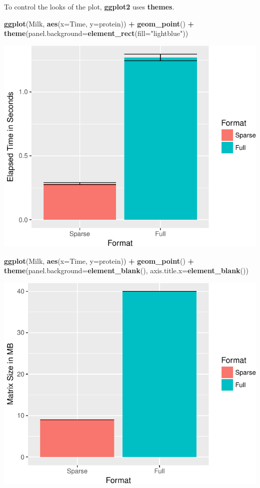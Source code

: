 \documentclass[]{book}
\newenvironment{Shaded}{\begin{snugshade}}{\end{snugshade}}
\newcommand{\KeywordTok}[1]{\textcolor[rgb]{0.13,0.29,0.53}{\textbf{#1}}}
\newcommand{\DataTypeTok}[1]{\textcolor[rgb]{0.13,0.29,0.53}{#1}}
\newcommand{\StringTok}[1]{\textcolor[rgb]{0.31,0.60,0.02}{#1}}
\newcommand{\OperatorTok}[1]{\textcolor[rgb]{0.81,0.36,0.00}{\textbf{#1}}}
\newcommand{\NormalTok}[1]{#1}
\theoremstyle{definition}
\theoremstyle{definition}
\theoremstyle{definition}
\theoremstyle{remark}
\begin{document}
To control the looks of the plot, \textbf{ggplot2} uses \textbf{themes}.

\begin{Shaded}
\begin{Highlighting}[]
\KeywordTok{ggplot}\NormalTok{(Milk, }\KeywordTok{aes}\NormalTok{(}\DataTypeTok{x=}\NormalTok{Time, }\DataTypeTok{y=}\NormalTok{protein)) }\OperatorTok{+}
\StringTok{  }\KeywordTok{geom_point}\NormalTok{() }\OperatorTok{+}
\StringTok{  }\KeywordTok{theme}\NormalTok{(}\DataTypeTok{panel.background=}\KeywordTok{element_rect}\NormalTok{(}\DataTypeTok{fill=}\StringTok{"lightblue"}\NormalTok{))}
\end{Highlighting}
\end{Shaded}

\includegraphics[width=0.5\linewidth]{Rcourse_files/figure-latex/unnamed-chunk-283-1}

\begin{Shaded}
\begin{Highlighting}[]
\KeywordTok{ggplot}\NormalTok{(Milk, }\KeywordTok{aes}\NormalTok{(}\DataTypeTok{x=}\NormalTok{Time, }\DataTypeTok{y=}\NormalTok{protein)) }\OperatorTok{+}
\StringTok{  }\KeywordTok{geom_point}\NormalTok{() }\OperatorTok{+}
\StringTok{  }\KeywordTok{theme}\NormalTok{(}\DataTypeTok{panel.background=}\KeywordTok{element_blank}\NormalTok{(),}
        \DataTypeTok{axis.title.x=}\KeywordTok{element_blank}\NormalTok{())}
\end{Highlighting}
\end{Shaded}

\includegraphics[width=0.5\linewidth]{Rcourse_files/figure-latex/unnamed-chunk-284-1}
\end{document}
